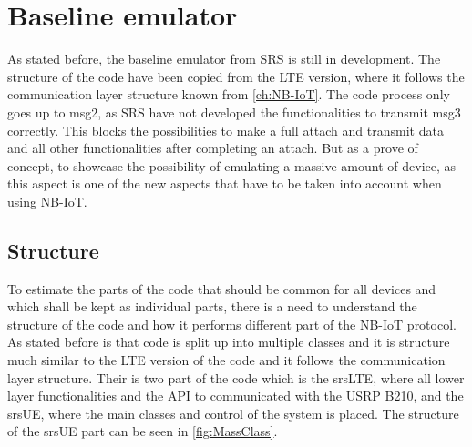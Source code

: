 


\section{Baseline emulator}
As stated before, the baseline emulator from SRS is still in development. The structure of the code have been copied from the LTE version, where it follows the communication layer structure known from \autoref{ch:NB-IoT}. The code process only goes up to msg2, as SRS have not developed the functionalities to transmit msg3 correctly. This blocks the possibilities to make a full attach and transmit data and all other functionalities after completing an attach. But as a prove of concept, to showcase the possibility of emulating a massive amount of device, as this aspect is one of the new aspects that have to be taken into account when using NB-IoT.



\subsection{Structure}
\label{sub:MassStruct}
To estimate the parts of the code that should be common for all devices and which shall be kept as individual parts, there is a need to understand the structure of the code and how it performs different part of the NB-IoT protocol. As stated before is that code is split up into multiple classes and it is structure much similar to the LTE version of the code and it follows the communication layer structure. Their is two part of the code which is the srsLTE, where all lower layer functionalities and the API to communicated with the USRP B210, and the srsUE, where the main classes and control of the system is placed. The structure of the srsUE part can be seen in \autoref{fig:MassClass}. 

